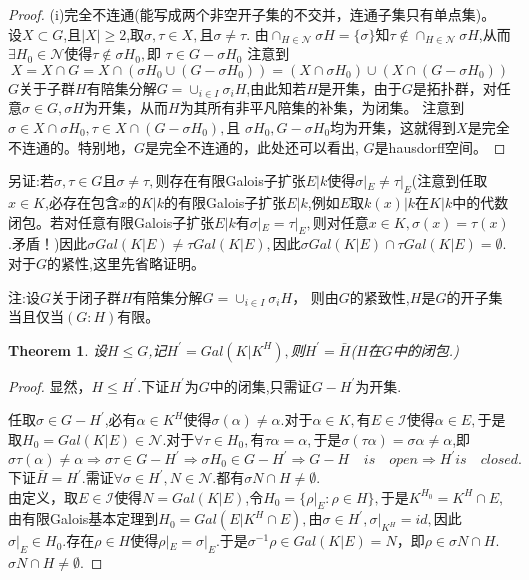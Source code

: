 \documentclass[UTF8]{article}
\newtheorem{thm}{Theorem}[section]
\begin{document}
\begin{proof}
(i)完全不连通(能写成两个非空开子集的不交并，连通子集只有单点集)。\\
设$X\subset  G$,且$|X|\geq 2$,取$\sigma,\tau\in X,$且$\sigma \neq \tau.$
由$\cap_{H\in \mathcal{N}}\sigma H=\{\sigma\}$知$\tau \notin \cap_{H\in \mathcal{N}}\sigma H$,从而$\exists H_{0}\in \mathcal{N}$使得$\tau \notin \sigma H_{0},$即
$\tau\in G-\sigma H_{0}$
注意到
$$X=X\cap G=X\cap (\sigma H_{0}\cup (G-\sigma H_{0}))=(X\cap \sigma H_{0})\cup (X\cap (G-\sigma H_{0}))$$
$G$关于子群$H$有陪集分解$G=\cup_{i\in I}\sigma_{i}H$,由此知若$H$是开集，由于$G$是拓扑群，对任意$\sigma \in G,$$\sigma H$为开集，从而$H$为其所有非平凡陪集的补集，为闭集。
注意到$\sigma \in X\cap \sigma H_{0} ,\tau \in X\cap (G-\sigma H_{0}),$且
$\sigma H_{0},G-\sigma H_{0}$均为开集，这就得到$X$是完全不连通的。特别地，$G$是完全不连通的，此处还可以看出,
$G$是hausdorff空间。

\end{proof}
另证:若$\sigma,\tau \in G$且$\sigma \neq \tau,$则存在有限Galois子扩张$E|k$使得$\sigma|_{E}\neq \tau|_{E}$(注意到任取$x\in K$,必存在包含$x$的$K|k$的有限Galois子扩张$E|k$,例如$E$取$k(x)|k$在$K|k$中的代数闭包。若对任意有限Galois子扩张$E|k$有$\sigma|_{E}=\tau|_{E},$则对任意$x\in K,\sigma(x)=\tau(x)$.矛盾！)因此$\sigma Gal(K|E)\neq \tau Gal(K|E),$因此$\sigma Gal(K|E)\cap \tau Gal(K|E)=\emptyset.$\\
对于$G$的紧性,这里先省略证明。


注:设$G$关于闭子群$H$有陪集分解$G=\cup_{i\in I}\sigma_{i}H$，
则由$G$的紧致性,$H$是$G$的开子集当且仅当$(G:H)$有限。\\
\begin{thm}
设$H\leq G$,记$H^{'}=Gal(K|K^{H}),$则$H^{'}=\bar{H}$($H$在$G$中的闭包.)
\end{thm}
\begin{proof}
显然，$H\leq H^{'}.$下证$H^{'}$为$G$中的闭集,只需证$G-H^{'}$为开集.


任取$\sigma\in G-H^{'}$,必有$\alpha \in K^{H}$使得$\sigma(\alpha)\neq \alpha.$对于$\alpha\in K,$有$E\in\mathcal{I}$使得$\alpha\in E,$于是取$H_{0}=Gal(K|E)\in\mathcal{N}.$对于$\forall\tau\in H_{0},$有$\tau\alpha=\alpha ,$于是$\sigma(\tau\alpha)=\sigma\alpha\neq \alpha $,即$$\sigma\tau(\alpha)\neq\alpha 
\Rightarrow\sigma\tau\in G-H^{'}\Rightarrow\sigma H_{0}\in G-H^{'}\Rightarrow G-H^{}\quad is\quad open\Rightarrow H^{'}is\quad  closed.$$
下证$\bar{H}=H^{'}.$需证$\forall \sigma \in H^{'},N\in \mathcal{N}.$都有$\sigma N\cap H\neq \emptyset.$\\
由定义，取$E\in \mathcal{I}$使得$N=Gal(K|E)$,令$H_{0}=\{\rho|_{E}:\rho\in H\},$于是$K^{H_{0}}=K^{H}\cap E,$由有限Galois基本定理到$H_{0}=Gal(E|K^{H}\cap E),$由$\sigma \in H^{'},\sigma|_{K^{H}}=id,$因此$\sigma|_{E}\in H_{0}.$存在$\rho\in H$使得$
\rho|_{E}=\sigma|_{E}.$于是$\sigma^{-1}\rho \in Gal(K|E)=N$，即$\rho\in \sigma N\cap H.$$\sigma N\cap H\neq \emptyset.$
\end{proof}
\end{document}
